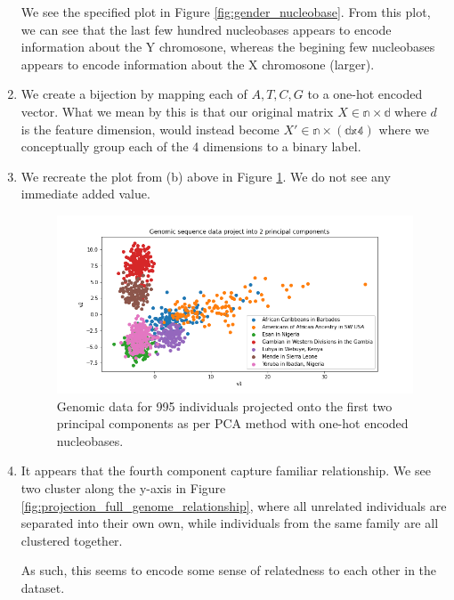 \documentclass[12pt]{article}
\begin{document}
\begin{enumerate}[label=(\alph*)]
    We see the specified plot in Figure \ref{fig:gender_nucleobase}. From this plot, we can see that the last few hundred nucleobases appears to encode information about the Y chromosone, whereas the begining few nucleobases appears to encode information about the X chromosone (larger).

  \item
    We create a bijection by mapping each of $A,T,C,G$ to a one-hot encoded vector. What we mean by this is that our original matrix $X \in \mathbb{n \times d}$ where $d$ is the feature dimension, would instead become $X' \in \mathbb{n \times (d x 4)}$ where we conceptually group each of the 4 dimensions to a binary label. 

  \item
    We recreate the plot from (b) above in Figure \ref{fig:projection_full_genome}. We do not see any immediate added value.

    \begin{figure}[!ht]
      \centering
      \includegraphics[scale=0.5]{figures/genomic_2d_projection_use_mode=False.png}
      \caption{Genomic data for 995 individuals projected onto the first two principal components as per PCA method with one-hot encoded nucleobases.}
      \label{fig:projection_full_genome}
    \end{figure}

  \item
    It appears that the fourth component capture familiar relationship. We see two cluster along the y-axis in Figure \ref{fig:projection_full_genome_relationship}, where all unrelated individuals are separated into their own own, while individuals from the same family are all clustered together.

    As such, this seems to encode some sense of relatedness to each other in the dataset.


\end{enumerate}
\end{document}
